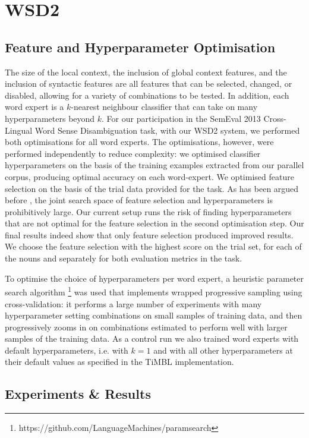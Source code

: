 \section{WSD2}
\label{sec:wsd2}

\subsection{Feature and Hyperparameter Optimisation}

The size of the local context, the inclusion of global context features, and
the inclusion of syntactic features are all features that can be selected,
changed, or disabled, allowing for a variety of combinations to be tested. In
addition, each word expert is a $k$-nearest neighbour classifier that can take
on many hyperparameters beyond $k$. For our participation in the SemEval 2013
Cross-Lingual Word Sense Disambiguation task, with our WSD2 system, we performed both
optimisations for all word experts. The optimisations, however, were performed
independently to reduce complexity: we optimised classifier hyperparameters on
the basis of the training examples extracted from our parallel corpus,
producing optimal accuracy on each word-expert. We optimised feature selection
on the basis of the trial data provided for the task. As has been argued before
\citep{Hoste+02}, the joint search space of feature selection and
hyperparameters is prohibitively large. Our current setup runs the risk of
finding hyperparameters that are not optimal for the feature selection in the
second optimisation step. Our final results indeed show that only feature
selection produced improved results. We choose the feature selection with the
highest score on the trial set, for each of the nouns and separately for both
evaluation metrics in the task.

To optimise the choice of hyperparameters per word expert, a heuristic
parameter search algorithm
\citep{PARAMSEARCH}\footnote{https://github.com/LanguageMachines/paramsearch} was used that
implements wrapped progressive sampling using cross-validation: it performs a
large number of experiments with many hyperparameter setting combinations on
small samples of training data, and then progressively zooms in on combinations
estimated to perform well with larger samples of the training data. As a
control run we also trained word experts with default hyperparameters, i.e.
with $k=1$ and with all other hyperparameters at their default values as
specified in the TiMBL implementation.

\subsection{Experiments \& Results}

